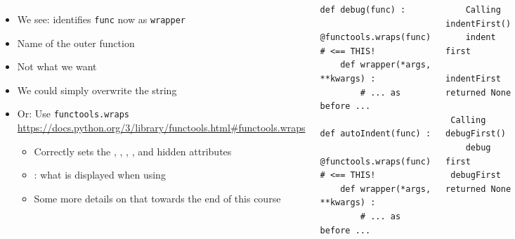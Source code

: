 \begin{frame}[fragile]
%
\begin{columns}[T]
\begin{itemize}
\item We see:  identifies \texttt{func} now as \texttt{wrapper}
\item Name of the outer function
\item Not what we want
\item We could simply overwrite the string
\item Or: Use \texttt{functools.wraps}	\\
	\scriptsize
	\url{https://docs.python.org/3/library/functools.html#functools.wraps}
	\begin{itemize}
	\item Correctly sets the , , , ,  and  hidden attributes
	\item {}: what is displayed when using 
	\item Some more details on that towards the end of this course
	\end{itemize}
\end{itemize}
%
\begin{codebox}
\begin{verbatim}
def debug(func) :
    @functools.wraps(func)    # <== THIS!
    def wrapper(*args, **kwargs) :
        # ... as before ...

def autoIndent(func) :
    @functools.wraps(func)    # <== THIS!
    def wrapper(*args, **kwargs) :
        # ... as before ...
\end{verbatim}
\end{codebox}
%
\begin{cmdbox}
\begin{verbatim}
    Calling indentFirst()
    indent first
    indentFirst returned None

 Calling debugFirst()
    debug first
 debugFirst returned None
\end{verbatim}
\end{cmdbox}
\end{columns}
%
\end{frame}


